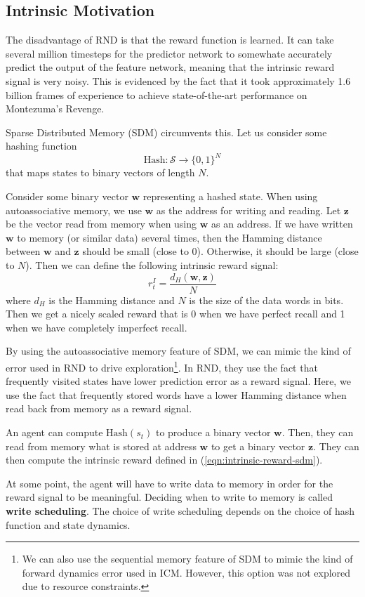 \documentclass[journal, onecolumn, 12pt, draftclsnofoot]{IEEEtran}
\newcommand{\kword}[1]{\textbf{#1}}
\newcommand{\mc}[1]{\mathcal{#1}}
\newcommand{\mbf}[1]{\mathbf{#1}}
\begin{document}
	\subsection{Intrinsic Motivation}
	\par The disadvantage of RND is that the reward function is learned. It can take several million timesteps for the predictor network to somewhate accurately predict the output of the feature network, meaning that the intrinsic reward signal is very noisy. This is evidenced by the fact that it took approximately 1.6 billion frames of experience to achieve state-of-the-art performance on Montezuma's Revenge.
	\par Sparse Distributed Memory (SDM) circumvents this. Let us consider some hashing function
	\begin{equation}
		\label{eqn:hash}
		\text{Hash}:\mc{S} \to \{ 0,1 \}^N
	\end{equation}
	that maps states to binary vectors of length $N$.
	\par Consider some binary vector $\mbf{w}$ representing a hashed state. When using autoassociative memory, we use $\mbf{w}$ as the address for writing and reading. Let $\mbf{z}$ be the vector read from memory when using $\mbf{w}$ as an address. If we have written $\mbf{w}$ to memory (or similar data) several times, then the Hamming distance between $\mbf{w}$ and $\mbf{z}$ should be small (close to 0). Otherwise, it should be large (close to $N$). Then we can define the following intrinsic reward signal:
	\begin{equation}
		\label{eqn:intrinsic-reward-sdm}
		r_t^I = \frac{d_H(\mbf{w}, \mbf{z})}{N}
	\end{equation}
	where $d_H$ is the Hamming distance and $N$ is the size of the data words in bits. Then we get a nicely scaled reward that is 0 when we have perfect recall and 1 when we have completely imperfect recall.
	\par By using the autoassociative memory feature of SDM, we can mimic the kind of error used in RND to drive exploration\footnote{We can also use the sequential memory feature of SDM to mimic the kind of forward dynamics error used in ICM. However, this option was not explored due to resource constraints.}. In RND, they use the fact that frequently visited states have lower prediction error as a reward signal. Here, we use the fact that frequently stored words have a lower Hamming distance when read back from memory as a reward signal.
	\par An agent can compute $\text{Hash}(s_t)$ to produce a binary vector $\mbf{w}$. Then, they can read from memory what is stored at address $\mbf{w}$ to get a binary vector $\mbf{z}$. They can then compute the intrinsic reward defined in (\ref{eqn:intrinsic-reward-sdm}).
	\par At some point, the agent will have to write data to memory in order for the reward signal to be meaningful. Deciding when to write to memory is called \kword{write scheduling}.	The choice of write scheduling depends on the choice of hash function and state dynamics.
\end{document}
